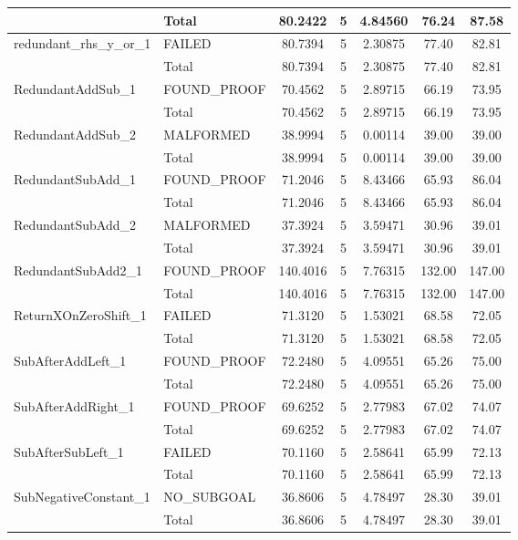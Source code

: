 \begin{appendices}
\begin{longtable}{L{0.25\textwidth} L{0.2\textwidth}  c  c  c  c  c }
    & Total & 80.2422 & 5 & 4.84560 & 76.24 & 87.58 \\ \midrule 
    redundant\_rhs\_y\_or\_1 & FAILED & 80.7394 & 5 & 2.30875 & 77.40 & 82.81 \\ \midrule 
    & Total & 80.7394 & 5 & 2.30875 & 77.40 & 82.81 \\ \midrule 
    RedundantAddSub\_1 & FOUND\_PROOF & 70.4562 & 5 & 2.89715 & 66.19 & 73.95 \\ \midrule 
    & Total & 70.4562 & 5 & 2.89715 & 66.19 & 73.95 \\ \midrule 
    RedundantAddSub\_2 & MALFORMED & 38.9994 & 5 & 0.00114 & 39.00 & 39.00 \\ \midrule 
    & Total & 38.9994 & 5 & 0.00114 & 39.00 & 39.00 \\ \midrule 
    RedundantSubAdd\_1 & FOUND\_PROOF & 71.2046 & 5 & 8.43466 & 65.93 & 86.04 \\ \midrule 
    & Total & 71.2046 & 5 & 8.43466 & 65.93 & 86.04 \\ \midrule 
    RedundantSubAdd\_2 & MALFORMED & 37.3924 & 5 & 3.59471 & 30.96 & 39.01 \\ \midrule 
    & Total & 37.3924 & 5 & 3.59471 & 30.96 & 39.01 \\ \midrule 
    RedundantSubAdd2\_1 & FOUND\_PROOF & 140.4016 & 5 & 7.76315 & 132.00 & 147.00 \\ \midrule 
    & Total & 140.4016 & 5 & 7.76315 & 132.00 & 147.00 \\ \midrule 
    ReturnXOnZeroShift\_1 & FAILED & 71.3120 & 5 & 1.53021 & 68.58 & 72.05 \\ \midrule 
    & Total & 71.3120 & 5 & 1.53021 & 68.58 & 72.05 \\ \midrule 
    SubAfterAddLeft\_1 & FOUND\_PROOF & 72.2480 & 5 & 4.09551 & 65.26 & 75.00 \\ \midrule 
    & Total & 72.2480 & 5 & 4.09551 & 65.26 & 75.00 \\ \midrule 
    SubAfterAddRight\_1 & FOUND\_PROOF & 69.6252 & 5 & 2.77983 & 67.02 & 74.07 \\ \midrule 
    & Total & 69.6252 & 5 & 2.77983 & 67.02 & 74.07 \\ \midrule 
    SubAfterSubLeft\_1 & FAILED & 70.1160 & 5 & 2.58641 & 65.99 & 72.13 \\ \midrule 
    & Total & 70.1160 & 5 & 2.58641 & 65.99 & 72.13 \\ \midrule 
    SubNegativeConstant\_1 & NO\_SUBGOAL & 36.8606 & 5 & 4.78497 & 28.30 & 39.01 \\ \midrule 
    & Total & 36.8606 & 5 & 4.78497 & 28.30 & 39.01 \\ \midrule 

\end{longtable}
\end{appendices}

